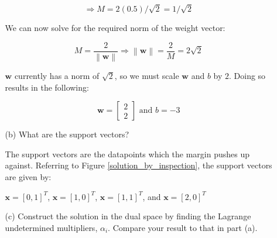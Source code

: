 \documentclass[fleqn]{article}
\newcommand{\norm}[1]{\left \lVert #1 \right \rVert}
\begin{document}
\begin{enumerate}
\begin{enumerate}
		\begin{equation*}
			\Rightarrow M = 2(0.5)/\sqrt{2} = 1/\sqrt{2} 
		\end{equation*}
		
		We can now solve for the required norm of the weight vector:
		
		\begin{equation*}
			M = \frac{2}{\norm{\mathbf{w}}} \Rightarrow \norm{\mathbf{w}} = \frac{2}{M} = 2\sqrt{2}
		\end{equation*}
		
		$\mathbf{w}$ currently has a norm of $\sqrt{2}$, so we must scale $\mathbf{w}$ and $b$ by $2$. Doing so results in the following:
		
		\begin{equation*}
			\mathbf{w} = \begin{bmatrix} 2 \\ 2 \end{bmatrix} \text{ and } b = -3
		\end{equation*}	
		
		\item[(b)] What are the support vectors?
		
		The support vectors are the datapoints which the margin pushes up against. Referring to Figure \ref{solution_by_inspection}, the support vectors are given by:
		
		$\mathbf{x} = [0, 1]^T$, $\mathbf{x} = [1, 0]^T$, $\mathbf{x} = [1, 1]^T$, and $\mathbf{x} = [2, 0]^T$
		
		
		
		\item[(c)] Construct the solution in the dual space by finding the Lagrange undetermined multipliers, $\alpha_i$. Compare your result to that in \newline part (a).
	\end{enumerate}
	\end{enumerate}
\end{document}
